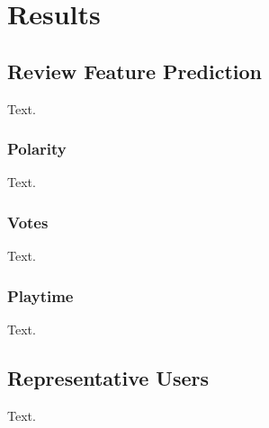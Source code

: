\chapter{Results} \label{sec:Res}

\section{Review Feature Prediction} \label{sec:Res_RF}

Text.

\subsection{Polarity} \label{sec:Res_RF_Pol}

Text.

\subsection{Votes} \label{sec:Res_RF_Votes}

Text.

\subsection{Playtime} \label{sec:Res_RF_PT}

Text.

\section{Representative Users} \label{sec:Res_RU}

Text.
